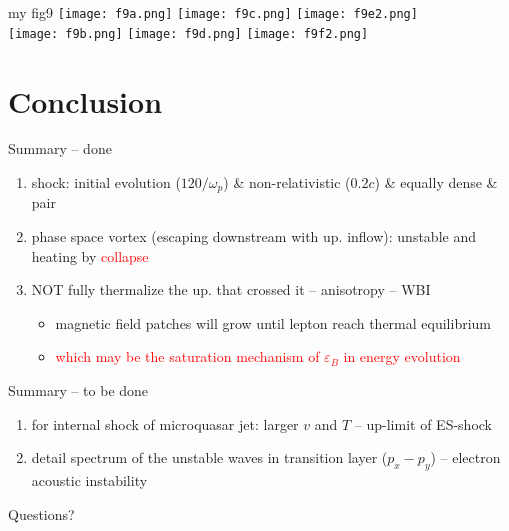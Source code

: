 \documentclass[10pt]{beamer}
\begin{document}
\begin{frame}{my fig9}
\texttt{[image: f9a.png]}
\texttt{[image: f9c.png]} 
\texttt{[image: f9e2.png]} \\
\texttt{[image: f9b.png]} 
\texttt{[image: f9d.png]}
\texttt{[image: f9f2.png]} \\
\end{frame}

\section{Conclusion}

\begin{frame}{Summary -- done}

\begin{enumerate}
\item shock: initial evolution ($120/\omega_p$) \& non-relativistic ($0.2c$) \& equally dense \& pair
\item phase space vortex (escaping downstream with up. inflow): unstable and heating by \textcolor{red}{collapse}
\item NOT fully thermalize the up. that crossed it -- anisotropy -- WBI
\begin{itemize}
\item magnetic field patches will grow until lepton reach thermal equilibrium
\item \textcolor{red}{which may be the saturation mechanism of $\varepsilon_B$ in energy evolution}
\end{itemize}
\end{enumerate}
\end{frame}

\begin{frame}{Summary -- to be done}
\begin{enumerate}
\item for internal shock of microquasar jet: larger $v$ and $T$ -- up-limit of ES-shock
\item detail spectrum of the unstable waves in transition layer ($p_x-p_y$) -- electron acoustic instability
\end{enumerate}

\end{frame}



\begin{frame}[standout]
  Questions?
\end{frame}
\end{document}
